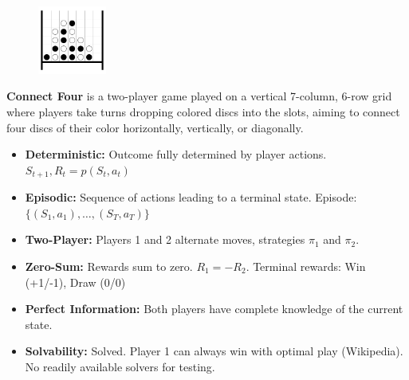 \documentclass[aspectratio=169,xcolor=dvipsnames]{beamer}
\begin{document}
\begin{frame}{}
    \begin{figure}[h]
    \centering
    \includegraphics[width=0.2\textwidth]{intro2.png}
    \label{fig:intro}
\end{figure}
    \textbf{Connect Four} is a two-player game played on a vertical 7-column, 6-row grid where players take turns dropping colored discs into the slots, aiming to connect four discs of their color horizontally, vertically, or diagonally.
\end{frame}


\begin{frame}{}
\begin{itemize}
    \item \textbf{Deterministic:} Outcome fully determined by player actions. $S_{t+1}, R_{t} = p(S_t, a_t)$
    \item \textbf{Episodic:} Sequence of actions leading to a terminal state. Episode: $\{(S_1, a_1), \dots, (S_T, a_T)\}$
    \item \textbf{Two-Player:} Players 1 and 2 alternate moves, strategies $\pi_1$ and $\pi_2$. %
    \item \textbf{Zero-Sum:} Rewards sum to zero.  $R_1 = -R_2$. Terminal rewards: Win (+1/-1), Draw (0/0)
    \item \textbf{Perfect Information:} Both players have complete knowledge of the current state.
    \item \textbf{Solvability:} Solved. Player 1 can always win with optimal play (Wikipedia). No readily available solvers for testing.
\end{itemize}
\end{frame}

\end{document}
